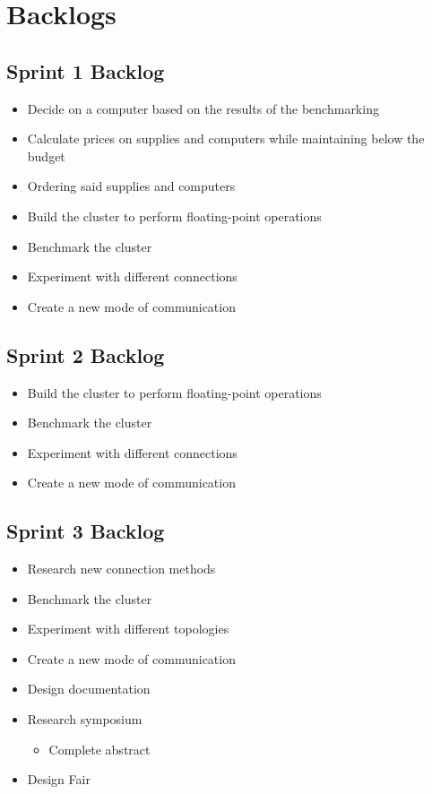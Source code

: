 \section{Backlogs}

\subsection*{Sprint 1 Backlog}
\begin{itemize}
	\item Decide on a computer based on the results of the benchmarking
	\item Calculate prices on supplies and computers while maintaining below the budget
	\item Ordering said supplies and computers
	\item Build the cluster to perform floating-point operations
	\item Benchmark the cluster
	\item Experiment with different connections
	\item Create a new mode of communication
\end{itemize}

\subsection*{Sprint 2 Backlog}
\begin{itemize}
	\item Build the cluster to perform floating-point operations
	\item Benchmark the cluster
	\item Experiment with different connections
	\item Create a new mode of communication
\end{itemize}

\subsection*{Sprint 3 Backlog}
\begin{itemize}
	\item Research new connection methods
	\item Benchmark the cluster
	\item Experiment with different topologies
	\item Create a new mode of communication
	\item Design documentation
	\item Research symposium
	\begin{itemize}
		\item Complete abstract
	\end{itemize}
	\item Design Fair
\end{itemize}

